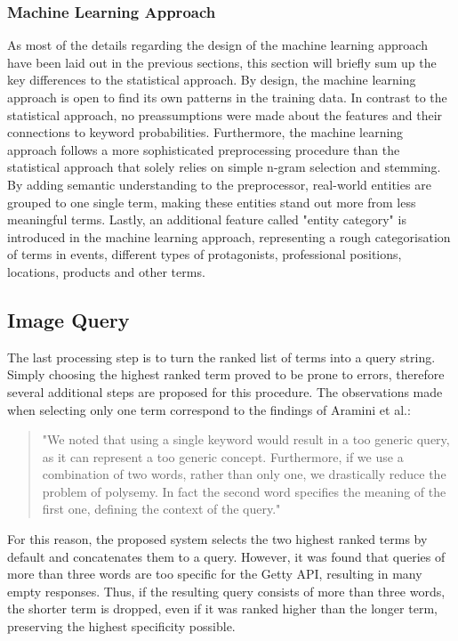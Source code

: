 \documentclass[11pt,a4paper,twoside]{article}
\begin{document}
\subsubsection{Machine Learning Approach} \label{SystemClassificationML}

As most of the details regarding the design of the machine learning approach have been laid out in the previous sections, this section will briefly sum up the key differences to the statistical approach. By design, the machine learning approach is open to find its own patterns in the training data. In contrast to the statistical approach, no preassumptions were made about the features and their connections to keyword probabilities. Furthermore, the machine learning approach follows a more sophisticated preprocessing procedure than the statistical approach that solely relies on simple n-gram selection and stemming. By adding semantic understanding to the preprocessor, real-world entities are grouped to one single term, making these entities stand out more from less meaningful terms. Lastly, an additional feature called "entity category" is introduced in the machine learning approach, representing a rough categorisation of terms in events, different types of protagonists, professional positions, locations, products and other terms.

\subsection{Image Query} \label{SystemQuery}

The last processing step is to turn the ranked list of terms into a query string. Simply choosing the highest ranked term proved to be prone to errors, therefore several additional steps are proposed for this procedure. The observations made when selecting only one term correspond to the findings of Aramini et al.:

\begin{quote}
"We noted that using a single keyword would result in a too generic query, as it can represent a too generic concept. Furthermore, if we use a combination of two words, rather than only one, we drastically reduce the problem of polysemy. In fact the second word specifies the meaning of the first one, defining the context of the query." \cite[p. 142]{Aramini2015AutomaticImages}
\end{quote}

For this reason, the proposed system selects the two highest ranked terms by default and concatenates them to a query. However, it was found that queries of more than three words are too specific for the Getty API, resulting in many empty responses. Thus, if the resulting query consists of more than three words, the shorter term is dropped, even if it was ranked higher than the longer term, preserving the highest specificity possible.
\end{document}
